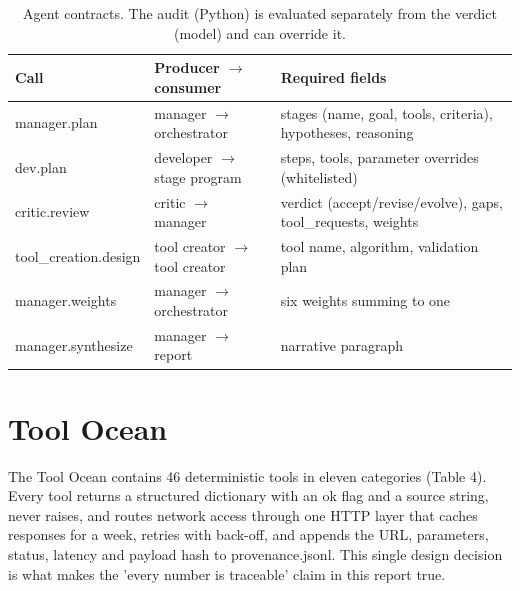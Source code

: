 \begin{table}[htbp]
\centering
\small
\caption{Agent contracts. The audit (Python) is evaluated separately from the verdict (model) and can override it.}
\begin{tabularx}{\textwidth}{l>{\raggedright\arraybackslash}X>{\raggedright\arraybackslash}X}
\hline
Call & Producer $\rightarrow$ consumer & Required fields \\
\hline
manager.plan & manager $\rightarrow$ orchestrator & stages\cite{r04} (name, goal, tools, criteria), hypotheses, reasoning \\
dev.plan & developer $\rightarrow$ stage program & steps, tools, parameter overrides (whitelisted) \\
critic.review & critic $\rightarrow$ manager & verdict (accept/revise/evolve), gaps, tool\_requests, weights \\
tool\_creation.design & tool creator $\rightarrow$ tool creator & tool name, algorithm, validation plan \\
manager.weights & manager $\rightarrow$ orchestrator & six weights summing to one \\
manager.synthesize & manager $\rightarrow$ report & narrative paragraph \\
\hline
\end{tabularx}

\end{table}

\section{Tool Ocean}

The Tool Ocean contains 46 deterministic tools in eleven categories (Table 4). Every tool returns a structured dictionary with an ok flag and a source string, never raises, and routes network access through one HTTP layer that caches responses for a week, retries with back-off, and appends the URL, parameters, status, latency and payload hash to provenance.jsonl. This single design decision is what makes the 'every number is traceable' claim in this report true.

